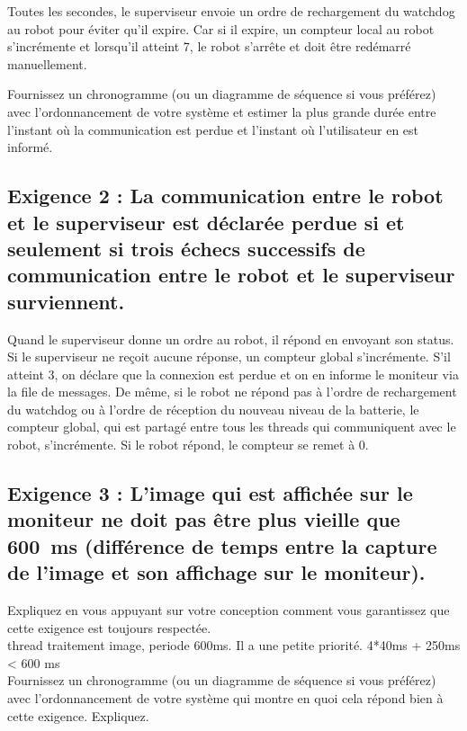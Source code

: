 \documentclass[11pt, a4paper]{paper}
\begin{document}
{\color{black} Toutes les secondes, le superviseur envoie un ordre de rechargement du watchdog au robot pour éviter qu'il expire. Car si il expire, un compteur local au robot s'incrémente et lorsqu'il atteint 7, le robot s'arrête et doit être redémarré manuellement. 

{\color{blue} Fournissez un chronogramme (ou un diagramme de séquence si vous préférez) avec l’ordonnancement de votre système et estimer la plus grande durée entre l'instant où la communication est perdue et l'instant où l'utilisateur en est informé.}

\subsection{Exigence 2 : La communication entre le robot et le superviseur est déclarée perdue si et seulement si trois échecs successifs de communication entre le robot et le superviseur surviennent.}

{\color{black} Quand le superviseur donne un ordre au robot, il répond en envoyant son status. Si le superviseur ne reçoit aucune réponse, un compteur global s'incrémente. S'il atteint 3, on déclare que la connexion est perdue et on en informe le moniteur via la file de messages. De même, si le robot ne répond pas à l'ordre de rechargement du watchdog ou à l'ordre de réception du nouveau niveau de la batterie, le compteur global, qui est partagé entre tous les threads qui communiquent avec le robot, s'incrémente. Si le robot répond, le compteur se remet à 0. }

\subsection{Exigence 3 : 
L'image qui est  affichée sur le moniteur ne doit pas être plus vieille que 600~ms (différence de temps entre la capture de l'image et son affichage sur le moniteur).}

{\color{blue} Expliquez en vous appuyant sur votre conception comment vous garantissez que cette exigence est toujours respectée. \\}
{\color{black} thread traitement image, periode 600ms. Il a une petite priorité. 4*40ms + 250ms < 600 ms \\}
{\color{blue} Fournissez un chronogramme (ou un diagramme de séquence si vous préférez) avec l’ordonnancement de votre système qui montre en quoi cela répond bien à cette exigence. Expliquez.}


}
\end{document}
